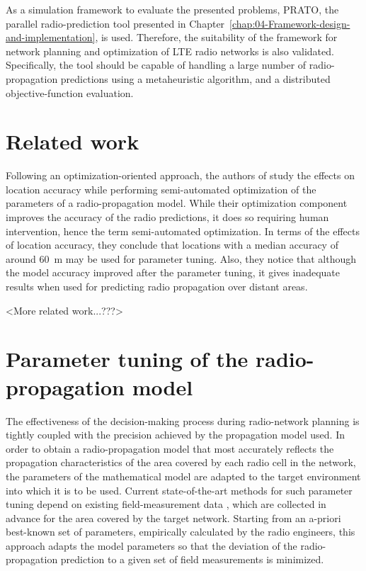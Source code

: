 As a simulation framework to evaluate the presented problems, PRATO,
the parallel radio-prediction tool presented in Chapter~\ref{chap:04-Framework-design-and-implementation},
is used. Therefore, the suitability of the framework for network planning
and optimization of LTE radio networks is also validated. Specifically,
the tool should be capable of handling a large number of radio-propagation
predictions using a metaheuristic algorithm, and a distributed objective-function
evaluation.


\section{Related work \label{sec:05-Related_work}}

Following an optimization-oriented approach, the authors of \cite{Aarnaes-Tuning_of_empirical_radio_propagation_models_effect_of_location_accuracy:2004}
study the effects on location accuracy while performing semi-automated
optimization of the parameters of a radio-propagation model. While
their optimization component improves the accuracy of the radio predictions,
it does so requiring human intervention, hence the term semi-automated
optimization. In terms of the effects of location accuracy, they conclude
that locations with a median accuracy of around 60~m may be used
for parameter tuning. Also, they notice that although the model accuracy
improved after the parameter tuning, it gives inadequate results when
used for predicting radio propagation over distant areas.

<More related work...???>


\section{Parameter tuning of the radio-propagation model \label{sec:05-Parameter_tuning_radio-propagation_model}}

The effectiveness of the decision-making process during radio-network
planning is tightly coupled with the precision achieved by the propagation
model used. In order to obtain a radio-propagation model that most
accurately reflects the propagation characteristics of the area covered
by each radio cell in the network, the parameters of the mathematical
model are adapted to the target environment into which it is to be
used. Current state-of-the-art methods for such parameter tuning depend
on existing field-measurement data \cite{Aarnaes-Tuning_of_empirical_radio_propagation_models_effect_of_location_accuracy:2004,Yang_A_linear_least_square_method_of_propagation_model_tuning_for_3G_radion_network_planning:2008},
which are collected in advance for the area covered by the target
network. Starting from an a-priori best-known set of parameters, empirically
calculated by the radio engineers, this approach adapts the model
parameters so that the deviation of the radio-propagation prediction
to a given set of field measurements is minimized.

